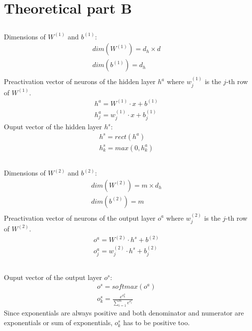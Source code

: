 \documentclass[12pt]{article}
\begin{document}
\section{Theoretical part B}
\subsection{}
Dimensions of $W^{(1)}$ and $b^{(1)}$:
\begin{align*}
dim(W^{(1)}) = d_h \times d \\
dim(b^{(1)}) = d_h \\
\end{align*}
Preactivation vector of neurons of the hidden layer $h^a$ where $w_j^{(1)}$ is the $j$-th row of $W^{(1)}$.
\begin{align*}
h^a=W^{(1)} \cdot x + b^{(1)} \\
h^a_j = w_j^{(1)} \cdot x + b^{(1)}_j
\end{align*}
Ouput vector of the hidden layer $h^s$:
\begin{align*}
h^s = rect(h^a)  \\
h^s_k = max(0,h^a_k)
\end{align*}


\subsection{}
Dimensions of $W^{(2)}$ and $b^{(2)}$:
\begin{align*}
dim(W^{(2)}) = m \times d_h \\
dim(b^{(2)}) = m \\
\end{align*}
Preactivation vector of neurons of the output layer $o^a$ where $w_j^{(2)}$ is the $j$-th row of $W^{(2)}$.
\begin{align*}
o^a=W^{(2)} \cdot h^s + b^{(2)} \\
o^a_j = w_j^{(2)} \cdot h^s + b^{(2)}_j
\end{align*}
\subsection{}
Ouput vector of the output layer $o^s$:
\begin{align*}
o^s = softmax(o^a)  \\
o^s_k = \frac{e^{o^a_k}}{\sum\limits_{i=1}^m e^{o^a_i}}
\end{align*}
Since exponentials are always positive and both denominator and numerator are exponentials or sum of exponentials, $o^s_k$ has to be positive too.
\end{document}
